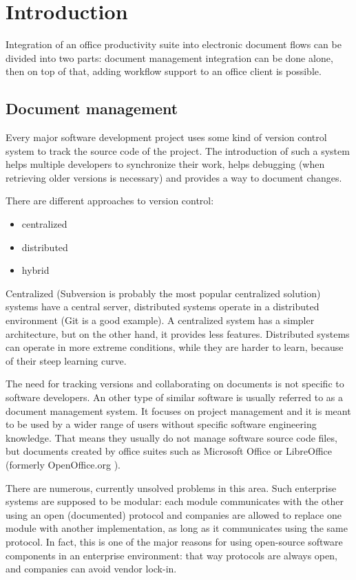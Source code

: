 \chapter{Introduction}

Integration of an office productivity suite into electronic document flows can be
divided into two parts: document management integration can be done alone, then
on top of that, adding workflow support to an office client is possible.

\section{Document management}

Every major software development project uses some kind of version control
system to track the source code of the project. The introduction of such a system
helps multiple developers to synchronize their work, helps debugging (when
retrieving older versions is necessary) and provides a way to document changes.

There are different approaches to version control:

\begin{itemize}
\item centralized
\item distributed
\item hybrid
\end{itemize}

Centralized (Subversion \cite{subversion} is probably the most
popular centralized solution) systems have a central server, distributed
systems operate in a distributed environment (Git \cite{git} is a good
example). A centralized system has a simpler architecture, but on the other
hand, it provides less features. Distributed systems can operate in more extreme
conditions, while they are harder to learn, because of their steep learning
curve.

The need for tracking versions and collaborating on documents is not specific to
software developers. An other type of similar software is usually referred to as
a document management system. It focuses on project management and it is meant to be
used by a wider range of users without specific software engineering knowledge.
That means they usually do not manage software source code files, but documents
created by office suites such as Microsoft Office \cite{mso} or
LibreOffice \cite{lo} (formerly OpenOffice.org \cite{ooo}).

There are numerous, currently unsolved problems in this area. Such enterprise
systems are supposed to be modular: each module communicates with the other
using an open (documented) protocol and companies are allowed to replace one
module with another implementation, as long as it communicates using the same
protocol. In fact, this is one of the major reasons for using open-source
software components in an enterprise environment: that way protocols are always
open, and companies can avoid vendor lock-in.

